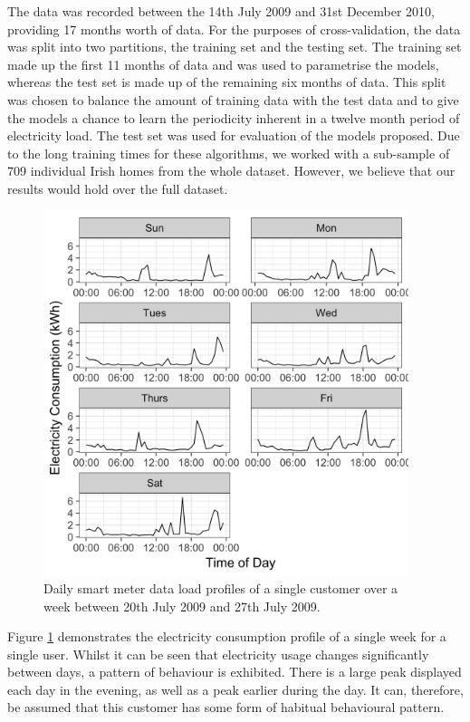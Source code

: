 The data was recorded between the 14th July 2009 and 31st December 2010, providing 17 months worth of data. For the purposes of cross-validation, the data was split into two partitions, the training set and the testing set. The training set made up the first 11 months of data and was used to parametrise the models, whereas the test set is made up of the remaining six months of data. This split was chosen to balance the amount of training data with the test data and to give the models a chance to learn the periodicity inherent in a twelve month period of electricity load. The test set was used for evaluation of the models proposed. Due to the long training times for these algorithms, we worked with a sub-sample of 709 individual Irish homes from the whole dataset. However, we believe that our results would hold over the full dataset.

\begin{figure}
	\centering
	\includegraphics[width=0.95\textwidth]{Chapter5/figures/short-term-forecasting/Rplot01.png}
	\caption{Daily smart meter data load profiles of a single customer over a week between 20th July 2009 and 27th July 2009. }
	\label{fig:single_user}
\end{figure}

Figure \ref{fig:single_user} demonstrates the electricity consumption profile of a single week for a single user. Whilst it can be seen that electricity usage changes significantly between days, a pattern of behaviour is exhibited. There is a large peak displayed each day in the evening, as well as a peak earlier during the day. It can, therefore, be assumed that this customer has some form of habitual behavioural pattern. 

